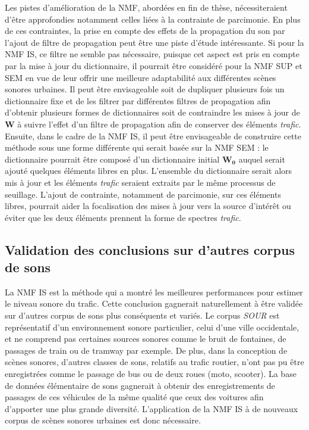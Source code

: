 Les pistes d'amélioration de la NMF, abordées en fin de thèse, nécessiteraient d'être approfondies notamment celles liées à la contrainte de parcimonie.
En plus de ces contraintes, la prise en compte des effets de la propagation du son par l'ajout de filtre de propagation peut être une piste d'étude intéressante. Si pour la NMF IS, ce filtre ne semble pas nécessaire, puisque cet aspect est pris en compte par la mise à jour du dictionnaire, il pourrait être considéré pour la NMF SUP et SEM en vue de leur offrir une meilleure adaptabilité aux différentes scènes sonores urbaines. Il peut être envisageable soit de dupliquer plusieurs fois un dictionnaire fixe et de les filtrer par différentes filtres de propagation afin d'obtenir plusieurs formes de dictionnaires soit de contraindre les mises à jour de $\mathbf{W}$ à suivre l'effet d'un filtre de propagation afin de conserver des éléments \textit{trafic}.
Ensuite, dans le cadre de la NMF IS, il peut être envisageable de construire cette méthode sous une forme différente qui serait basée sur la NMF SEM : le dictionnaire pourrait être composé d'un dictionnaire initial $\mathbf{W_0}$ auquel serait ajouté quelques éléments libres en plus. L'ensemble du dictionnaire serait alors mis à jour et les éléments \textit{trafic} seraient extraits par le même processus de seuillage. L'ajout de contrainte, notamment de parcimonie, sur ces éléments libres, pourrait aider la focalisation des mises à jour vers la source d'intérêt ou éviter que les deux éléments prennent la forme de spectres \textit{trafic}.

\subsection*{Validation des conclusions sur d'autres corpus de sons}
La NMF IS  est la méthode qui a montré les meilleures performances pour estimer le niveau sonore du trafic.  Cette conclusion gagnerait naturellement à être validée sur d'autres corpus de sons plus conséquents et variés. Le corpus \textit{SOUR} est représentatif d'un environnement sonore particulier, celui d'une ville occidentale, et ne comprend pas certaines sources sonores comme le bruit de fontaines, de passages de train ou de tramway par exemple. De plus, dans la conception de scènes sonores, d'autres classes de sons, relatifs au trafic routier, n'ont pas pu être enregistrées comme le passage de bus ou de deux roues (moto, scooter). La base de données élémentaire de sons gagnerait à obtenir des enregistrements de passages de ces véhicules de la même qualité que ceux des voitures afin d'apporter une plus grande diversité. L'application de la NMF IS à de nouveaux corpus de scènes sonores urbaines est donc nécessaire.

